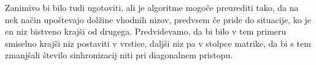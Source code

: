 \documentclass[a4paper,12pt,openright]{book}
\begin{document}
Zanimivo bi bilo tudi ugotoviti, ali je algoritme mogoče preurediti tako, da na nek način upoštevajo dolžine vhodnih nizov, predvsem če pride do situacije, ko je en niz bistveno krajši od drugega. Predvidevamo, da bi bilo v tem primeru smiselno krajši niz postaviti v vrstice, daljši niz pa v stolpce matrike, da bi s tem zmanjšali število sinhronizacij niti pri diagonalnem pristopu. 




\raggedright




\printbibliography[heading=bibintoc,title={Literatura}]
\end{document}
